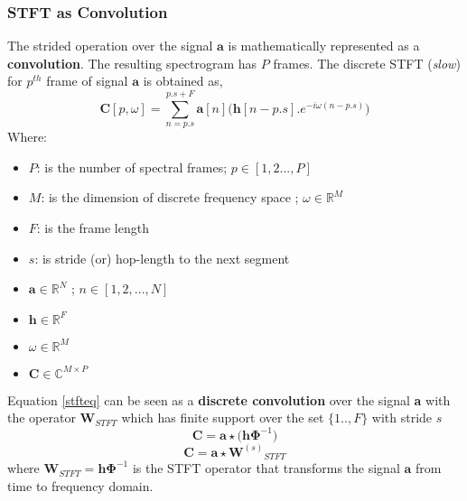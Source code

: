\subsubsection{STFT as Convolution}
\noindent The strided operation over the signal $\textbf{a}$ is mathematically represented as a \textbf{convolution}. The resulting spectrogram has $P$ frames. The discrete STFT (\textit{slow}) for $p^{th}$ frame of signal $\textbf{a}$ is obtained as,
\begin{equation}
\label{stfteq}
\textbf{C}[p, \omega ] = \displaystyle\sum_{n=p.s}^{p.s + F}\textbf{a}[n] \Big( \textbf{h}[n-p.s] . e^{-i \omega (n-p.s)} \Big)
\end{equation}
Where:
\begin{itemize}[label=]
    \setlength\itemsep{0em}
    \item $P$: is the number of spectral frames; $p \in [1,2...,P]$ 
    \item $M$: is the dimension of discrete frequency space ; $\omega \in \mathbb{R}^{M}$
    \item $F$: is the frame length 
    \item $s$: is stride (or) hop-length to the next segment
    \item $\textbf{a} \in  \mathbb{R}^{N}$ ; $n \in [1,2,...,N]$
    \item $\textbf{h} \in  \mathbb{R}^{F}$
    \item $\omega \in  \mathbb{R}^{M}$
    \item $\textbf{C} \in \mathbb{C}^{M \times P}$
\end{itemize}
\noindent Equation \ref{stfteq} can be seen as a \textbf{discrete convolution} over the signal \textbf{a} with the operator $\textbf{W}_{STFT}$ which has finite support over the set $\{1..,F\}$ with stride $s$
\[
\textbf{C} = \textbf{a} \star \big( \textbf{h} \bm{\Phi}^{-1} \big)
\]
\begin{equation}
\label{eq:stft}
\textbf{C} = \textbf{a} \star {\textbf{W}^{(s)}}_{STFT}
\end{equation}
where $\textbf{W}_{STFT} = \textbf{h} \bm{\Phi}^{-1}$ is the STFT operator that transforms the signal $\textbf{a}$ from time to frequency domain. 
\bigskip

